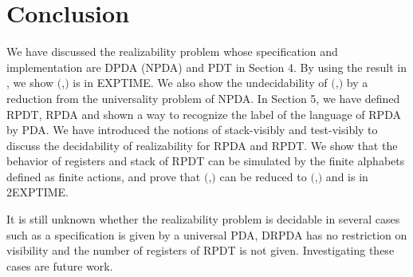 \section{Conclusion}
We have discussed the realizability problem
whose specification and implementation are
DPDA (NPDA) and PDT in Section 4.
By using the result in \cite{Wa96},
we show \Real$($\DPDA,\PDT$)$ is in EXPTIME.
We also show the undecidability of \Real$($\NPDA,\PDT$)$
by a reduction from the universality problem of NPDA.
In Section 5, we have defined RPDT, RPDA and
shown a way to recognize the label of the language of RPDA by PDA.
We have introduced the notions of stack-visibly \cite{AM04} and
test-visibly to discuss the decidability of realizability
for RPDA and RPDT.
We show that the behavior of registers and stack of RPDT
can be simulated by the finite alphabets defined as finite actions,
and prove that \Real$($\DRPDAv,\RPDTk$)$ can be reduced to \Real$($\DPDA,\PDT$)$ and is in 2EXPTIME.

It is still unknown whether the realizability problem is decidable
in several cases such as
a specification is given by a universal PDA,
DRPDA has no restriction on visibility and
the number of registers of RPDT is not given.
Investigating these cases are future work.
